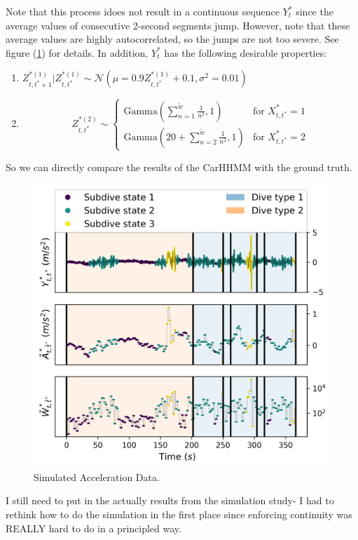 Note that this process idoes not result in a continuous sequence $Y^*_t$ since the average values of consecutive 2-second segments jump. However, note that these average values are highly autocorrelated, so the jumps are not too severe. See figure (\ref{fig:sim_data}) for details. In addition, $Y^*_t$ has the following desirable properties:

\begin{enumerate}
	\item $Z^{*(1)}_{t,t^*+1} | Z^{*(1)}_{t,t^*} \sim \mathcal{N} \left(\mu = 0.9 Z^{*(1)}_{t,t^*} + 0.1, \sigma^2 = 0.01 \right)$
	\item $$Z^{*(2)}_{t,t^*} \sim \left\{\begin{array}{lr} 
	\text{Gamma}(\sum_{n=1}^{\tilde{w}} \frac{1}{n^2},1) & \text{for } X^*_{t,t^*} = 1 \\
	\text{Gamma}(20 + \sum_{n=2}^{\tilde{w}} \frac{1}{n^2},1) & \text{for } X^*_{t,t^*} = 2
	\end{array}\right. $$
\end{enumerate}

So we can directly compare the results of the CarHHMM with the ground truth.

\begin{figure}[!ht]
	\centering
	\includegraphics[width=5in]{../../Plots/sim_data.png}
	\caption{Simulated Acceleration Data.}
	\label{fig:sim_data}
\end{figure}
I still need to put in the actually results from the simulation study- I had to rethink how to do the simulation in the first place since enforcing continuity was REALLY hard to do in a principled way. 

